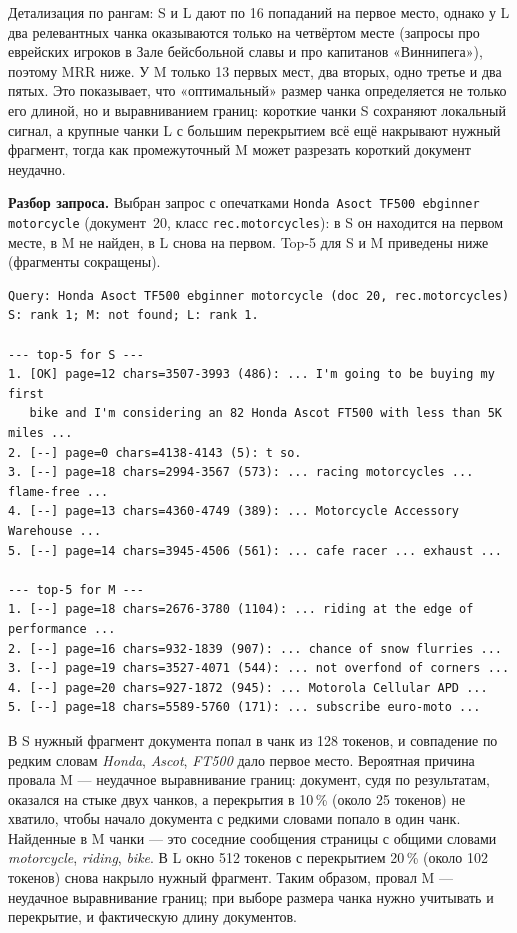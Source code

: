 \documentclass[14pt,a4paper]{extarticle}
\begin{document}
Детализация по рангам: S и L дают по 16 попаданий на первое место, однако
у L два релевантных чанка оказываются только на четвёртом месте (запросы
про еврейских игроков в Зале бейсбольной славы и про капитанов «Виннипега»),
поэтому MRR ниже. У M только 13 первых мест, два вторых, одно третье и два
пятых. Это показывает, что «оптимальный» размер чанка определяется не только
его длиной, но и выравниванием границ: короткие чанки S сохраняют локальный
сигнал, а крупные чанки L с большим перекрытием всё ещё накрывают нужный
фрагмент, тогда как промежуточный M может разрезать короткий документ неудачно.

\textbf{Разбор запроса.} Выбран запрос с опечатками
\texttt{Honda Asoct TF500 ebginner motorcycle} (документ~20, класс
\texttt{rec.motorcycles}): в S он находится на первом месте, в M не найден,
в L снова на первом. Top-5 для S и M приведены ниже (фрагменты сокращены).

\begin{lstlisting}[basicstyle=\ttfamily\footnotesize,language={}]
Query: Honda Asoct TF500 ebginner motorcycle (doc 20, rec.motorcycles)
S: rank 1; M: not found; L: rank 1.

--- top-5 for S ---
1. [OK] page=12 chars=3507-3993 (486): ... I'm going to be buying my first
   bike and I'm considering an 82 Honda Ascot FT500 with less than 5K miles ...
2. [--] page=0 chars=4138-4143 (5): t so.
3. [--] page=18 chars=2994-3567 (573): ... racing motorcycles ... flame-free ...
4. [--] page=13 chars=4360-4749 (389): ... Motorcycle Accessory Warehouse ...
5. [--] page=14 chars=3945-4506 (561): ... cafe racer ... exhaust ...

--- top-5 for M ---
1. [--] page=18 chars=2676-3780 (1104): ... riding at the edge of performance ...
2. [--] page=16 chars=932-1839 (907): ... chance of snow flurries ...
3. [--] page=19 chars=3527-4071 (544): ... not overfond of corners ...
4. [--] page=20 chars=927-1872 (945): ... Motorola Cellular APD ...
5. [--] page=18 chars=5589-5760 (171): ... subscribe euro-moto ...
\end{lstlisting}
\label{fig:case}

В S нужный фрагмент документа попал в чанк из 128 токенов, и совпадение
по редким словам \textit{Honda}, \textit{Ascot}, \textit{FT500} дало первое
место. Вероятная причина провала M --- неудачное выравнивание границ:
документ, судя по результатам, оказался на стыке двух чанков, а перекрытия
в 10\,\% (около 25 токенов) не хватило, чтобы начало документа с редкими
словами попало в один чанк. Найденные в M чанки --- это соседние сообщения
страницы с общими словами \textit{motorcycle}, \textit{riding}, \textit{bike}.
В L окно 512 токенов с перекрытием 20\,\% (около 102 токенов) снова накрыло
нужный фрагмент. Таким образом, провал M --- неудачное выравнивание границ; при выборе
размера чанка нужно учитывать и перекрытие, и фактическую длину документов.
\end{document}
